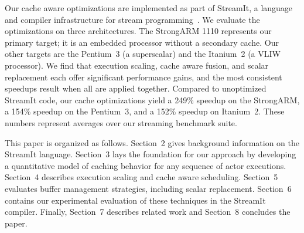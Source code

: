 Our cache aware optimizations are implemented as part of StreamIt, a
language and compiler infrastructure for stream
programming~\cite{streamitcc}.  We evaluate the optimizations on three
architectures.  The StrongARM 1110 represents our primary target; it
is an embedded processor without a secondary cache.  Our other targets
are the Pentium~3 (a superscalar) and the Itanium~2 (a VLIW
processor).  We find that execution scaling, cache aware fusion, and
scalar replacement each offer significant performance gains, and the
most consistent speedups result when all are applied together.
Compared to unoptimized StreamIt code, our cache optimizations yield a
249\% speedup on the StrongARM, a 154\% speedup on the Pentium~3, and
a 152\% speedup on Itanium~2.  These numbers represent averages over
our streaming benchmark suite.

This paper is organized as follows.  Section~2 gives background
information on the StreamIt language.  Section~3 lays the foundation
for our approach by developing a quantitative model of caching
behavior for any sequence of actor executions.  Section~4 describes
execution scaling and cache aware scheduling.  Section~5 evaluates
buffer management strategies, including scalar replacement.  Section~6
contains our experimental evaluation of these techniques in the
StreamIt compiler.  Finally, Section~7 describes related work and
Section~8 concludes the paper.


